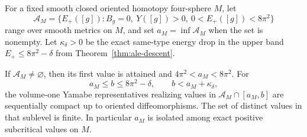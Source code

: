 For a fixed smooth closed oriented homotopy four-sphere \(M\), let
\[
 \mathcal A_M=\{E_+([g]): B_g=0,\ Y([g])>0,\ 0<E_+([g])<8\pi^2\}
\]
range over smooth metrics on \(M\), and set
\(a_M=\inf\mathcal A_M\) when the set is nonempty. Let
\(\kappa_\delta>0\) be the exact same-type energy drop in the
upper band \(E_+\le 8\pi^2-\delta\) from
Theorem~\ref{thm:ale-descent}.

\begin{theorem}\label{alt:critical}
If \(\mathcal A_M\ne\varnothing\), then its first value is attained
and \(4\pi^2<a_M<8\pi^2\). For
\[
 a_M\le b\le8\pi^2-\delta,\qquad b<a_M+\kappa_\delta ,
\]
the volume-one Yamabe representatives realizing values in
\(\mathcal A_M\cap[a_M,b]\) are sequentially compact up to oriented
diffeomorphisms. The set of distinct values in that sublevel is
finite. In particular \(a_M\) is isolated among exact positive
subcritical values on \(M\).
\end{theorem}

